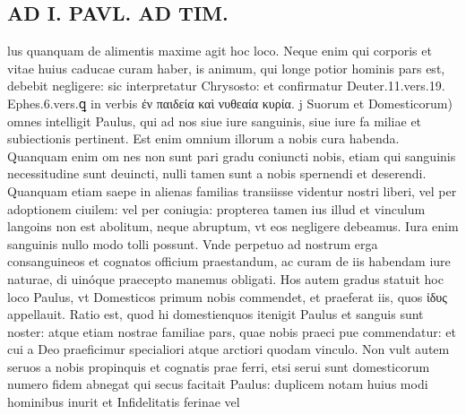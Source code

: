 \documentclass{article}
\begin{document}
\begin{pages}
\section*{AD I. PAVL. AD TIM. }
\marginpar{[ p.266 ]}\pstart lus quanquam de alimentis maxime agit hoc loco. Neque enim qui corporis et vitae huius caducae curam haber, is animum, qui longe potior hominis pars est, debebit negligere: sic interpretatur Chrysosto: et confirmatur Deuter.11.vers.19. Ephes.6.vers.ꝗ in verbis ἐν παιδεία καὶ νυθεαία κυρία. j  \pend\pstart Suorum et Domesticorum) omnes intelligit Paulus, qui ad nos siue iure sanguinis, siue iure fa miliae et subiectionis pertinent. Est enim omnium illorum a nobis cura habenda. Quanquam enim om nes non sunt pari gradu coniuncti nobis, etiam qui sanguinis necessitudine sunt deuincti, nulli tamen sunt a nobis spernendi et deserendi. Quanquam etiam saepe in alienas familias transiisse videntur nostri liberi, vel per adoptionem ciuilem: vel per coniugia: propterea tamen ius illud et vinculum langoins non est abolitum, neque abruptum, vt eos negligere debeamus. Iura enim sanguinis nullo modo tolli possunt. Vnde perpetuo ad nostrum erga consanguineos et cognatos officium praestandum, ac curam de iis habendam iure naturae, di uinóque praecepto manemus obligati.  \pend\pstart Hos autem gradus statuit hoc loco Paulus, vt Domesticos primum nobis commendet, et praeferat iis, quos ἰδυς appellauit. Ratio est, quod hi domestienquos itenigit Paulus et sanguis sunt noster: atque etiam nostrae familiae pars, quae nobis praeci pue commendatur: et cui a Deo praeficimur specialiori atque arctiori quodam vinculo. Non vult autem seruos a nobis propinquis et cognatis prae ferri, etsi serui sunt domesticorum numero fidem abnegat qui secus facitait Paulus: duplicem notam huius modi hominibus inurit et Infidelitatis ferinae vel  \pend

\end{pages}
\end{document}

